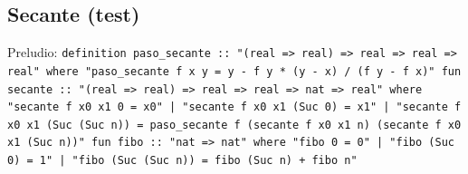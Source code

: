 \documentclass[11pt,a4paper]{article}
\begin{document}
\subsection{Secante (test)}

{\footnotesize Preludio: \texttt{definition paso\_\allowbreak{}secante :\allowbreak{}:\allowbreak{} "(\allowbreak{}real =\allowbreak{}> real) =\allowbreak{}> real =\allowbreak{}> real =\allowbreak{}> real" where "paso\_\allowbreak{}secante f x y =\allowbreak{} y -\allowbreak{} f y *\allowbreak{} (\allowbreak{}y -\allowbreak{} x) /\allowbreak{} (\allowbreak{}f y -\allowbreak{} f x)" fun secante :\allowbreak{}:\allowbreak{} "(\allowbreak{}real =\allowbreak{}> real) =\allowbreak{}> real =\allowbreak{}> real =\allowbreak{}> nat =\allowbreak{}> real" where "secante f x0 x1 0 =\allowbreak{} x0" |\allowbreak{} "secante f x0 x1 (\allowbreak{}Suc 0) =\allowbreak{} x1" |\allowbreak{} "secante f x0 x1 (\allowbreak{}Suc (\allowbreak{}Suc n)) =\allowbreak{} paso\_\allowbreak{}secante f (\allowbreak{}secante f x0 x1 n) (\allowbreak{}secante f x0 x1 (\allowbreak{}Suc n))" fun fibo :\allowbreak{}:\allowbreak{} "nat =\allowbreak{}> nat" where "fibo 0 =\allowbreak{} 0" |\allowbreak{} "fibo (\allowbreak{}Suc 0) =\allowbreak{} 1" |\allowbreak{} "fibo (\allowbreak{}Suc (\allowbreak{}Suc n)) =\allowbreak{} fibo (\allowbreak{}Suc n) +\allowbreak{} fibo n"}\par}
\end{document}
